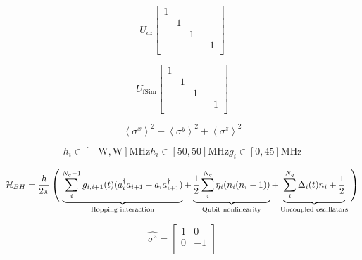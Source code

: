 \begin{equation}
    U_{cz}
    \begin{bmatrix}
        1 &  &  & \\
        & 1 &  & \\
        &  & 1 & \\
        &  &  & -1\\
    \end{bmatrix}
\end{equation}




\begin{equation}
    U_{\textrm{fSim}}
    \begin{bmatrix}
        1 &  &   & \\
        & 1 &   & \\
        &  & 1  & \\
        &  &  & -1\\
    \end{bmatrix}
\end{equation}

\begin{equation}
    \left< \sigma^{x} \right>^{2} + \left< \sigma^{y} \right>^{2} + \left< \sigma^{z} \right>^{2}
\end{equation}


\begin{equation}
    h_{i} \in \left[ -\textrm{W}, \textrm{W} \right] \textrm{MHz}
    h_{i} \in \left[ 50, 50 \right] \textrm{MHz}
    g_{i} \in \left[ 0,  45 \right] \textrm{MHz}
\end{equation}



\begin{equation}
    \mathcal{H}_{BH} =\frac{\hbar}{2 \pi} \left(\vphantom{\sum\limits_{i}^{N_{q}}}\right.
    \underbrace{\sum\limits_{i}^{N_{q} - 1} g_{i,i+1}(t) (a_i^\dagger a_{i+1} + a_i a_{i+1}^\dagger)}_{\text{Hopping interaction}} +
    \underbrace{\frac{1}{2} \sum\limits_{i}^{N_q} \eta_i (n_i (n_i-1))}_{\text{Qubit nonlinearity}} +
    \underbrace{\sum\limits_{i}^{N_q} \Delta_i (t) n_i + \frac {1}{2}}_{\text{Uncoupled oscillators}}
    \left.\vphantom{\sum\limits_{i}^{N_{q}}}\right)
    \label{BH_Hamiltonian}
\end{equation}

\begin{equation}
    \hat{\sigma^{z}}=
    \begin{bmatrix}
        1 & 0\\
        0 & -1\\
    \end{bmatrix}
\end{equation}


